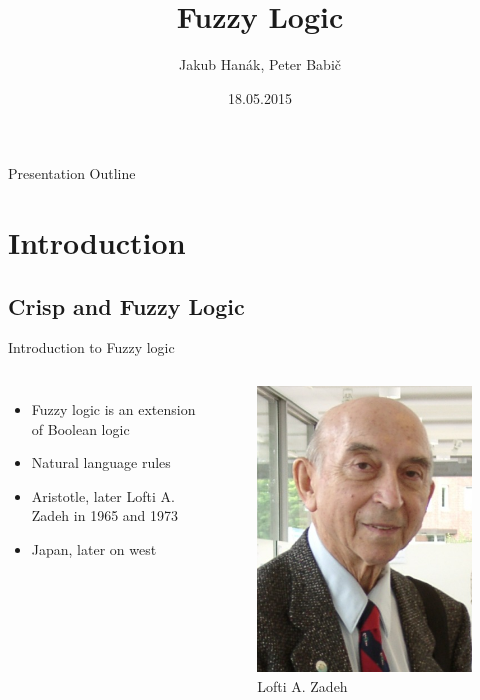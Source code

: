 \documentclass[hyperref={unicode}]{beamer}
\title[Fuzzy logic]{Fuzzy Logic}
\author{Jakub Hanák, Peter Babič}
\institute{Technical University of Košice, Slovakia}
\date{18.05.2015}
\begin{document}
\boldmath


\begin{frame}
	\titlepage
\end{frame}

\begin{frame}{Presentation Outline}
  \tableofcontents
\end{frame}



\section{Introduction}


\subsection{Crisp and Fuzzy Logic}

\begin{frame}{Introduction to Fuzzy logic}
	\begin{columns}
		\begin{itemize}
		\item Fuzzy logic is an extension of Boolean logic
		\item Natural language rules
		\item Aristotle, later Lofti A. Zadeh in 1965 and 1973
		\item Japan, later on west
		\end{itemize}

		\begin{figure}[b]
		\includegraphics{lofti.jpg}
		\caption{Lofti A. Zadeh}
		\end{figure}
	\end{columns}
\end{frame}
\end{document}
